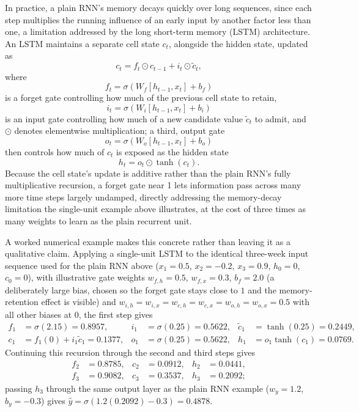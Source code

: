 \documentclass[../ai_in_finance]{subfiles}
\begin{document}
In practice, a plain RNN's memory decays quickly over long sequences, since each step multiplies the running influence of an early input by another factor less than one, a limitation addressed by the long short-term memory (LSTM) architecture. An LSTM maintains a separate cell state $c_t$, alongside the hidden state, updated as
$$c_t = f_t \odot c_{t-1} + i_t \odot \tilde c_t,$$
where
$$f_t = \sigma(W_f[h_{t-1},x_t] + b_f)$$
is a forget gate controlling how much of the previous cell state to retain,
$$i_t = \sigma(W_i[h_{t-1},x_t]+b_i)$$
is an input gate controlling how much of a new candidate value $\tilde c_t$ to admit, and $\odot$ denotes elementwise multiplication; a third, output gate
$$o_t = \sigma(W_o[h_{t-1},x_t]+b_o)$$ then controls how much of $c_t$ is exposed as the hidden state
$$h_t = o_t \odot \tanh(c_t).$$
 Because the cell state's update is additive rather than the plain RNN's fully multiplicative recursion, a forget gate near 1 lets information pass across many more time steps largely undamped, directly addressing the memory-decay limitation the single-unit example above illustrates, at the cost of three times as many weights to learn as the plain recurrent unit.

A worked numerical example makes this concrete rather than leaving it as a qualitative claim. Applying a single-unit LSTM to the identical three-week input sequence used for the plain RNN above ($x_1=0.5$, $x_2=-0.2$, $x_3=0.9$, $h_0=0$, $c_0=0$), with illustrative gate weights $w_{f,h}=0.5$, $w_{f,x}=0.3$, $b_f=2.0$ (a deliberately large bias, chosen so the forget gate stays close to $1$ and the memory-retention effect is visible) and $w_{i,h}=w_{i,x}=w_{c,h}=w_{c,x}=w_{o,h}=w_{o,x}=0.5$ with all other biases at $0$, the first step gives
\begin{align*}
f_1 &= \sigma(2.15) = 0.8957, & i_1 &= \sigma(0.25) = 0.5622, & \tilde c_1 &= \tanh(0.25) = 0.2449, \\
c_1 &= f_1(0) + i_1\tilde c_1 = 0.1377, & o_1 &= \sigma(0.25) = 0.5622, & h_1 &= o_1\tanh(c_1) = 0.0769.
\end{align*}
Continuing this recursion through the second and third steps gives
\begin{align*}
f_2 &= 0.8785, & c_2 &= 0.0912, & h_2 &= 0.0441, \\
f_3 &= 0.9082, & c_3 &= 0.3537, & h_3 &= 0.2092;
\end{align*}
passing $h_3$ through the same output layer as the plain RNN example ($w_y=1.2$, $b_y=-0.3$) gives $\hat y=\sigma(1.2(0.2092)-0.3)=0.4878$.
\end{document}

